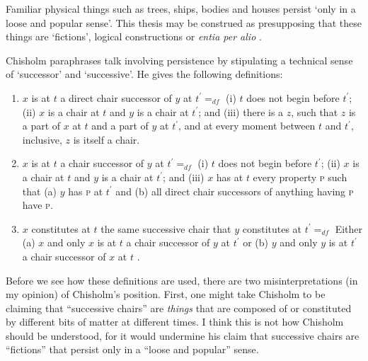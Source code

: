 \documentclass[11pt]{article}
\newenvironment{squote}{%
\begin{spacing}{1}
\begin{list}{}{%
\setlength{\labelwidth}{0pt}%
\rightmargin\leftmargin%
}
\item\relax
}{%
\end{list}%
\end{spacing}
}
\begin{document}
\begin{spacing}{1.5}
\begin{squote}
Familiar physical things such as trees, ships, bodies and houses
persist `only in a loose and popular sense'.  This thesis may be
construed as presupposing that these things are `fictions', logical
constructions or {\em entia per alio} \citeyearpar[97]{chisholm1979}.
\end{squote}

Chisholm paraphrases talk involving persistence by stipulating a
technical sense of `successor' and `successive'.  He gives the
following definitions:

\begin{enumerate}[ref=\arabic*]
  \item $x$ is at $t$ a direct chair successor of $y$ at $t^{\prime}
    =_{df}$ (i) $t$ does not begin before $t^{\prime}$; (ii) $x$ is a
    chair at $t$ and $y$ is a chair at $t^{\prime}$; and (iii) there
    is a $z$, such that $z$ is a part of $x$ at $t$ and a part of $y$
    at $t^{\prime}$, and at every moment between $t$ and $t^{\prime}$,
    inclusive, $z$ is itself a chair. \label{suc1}
  \item $x$ is at $t$ a chair successor of $y$ at $t^{\prime} =_{df}$
    (i) $t$ does not begin before $t^{\prime}$; (ii) $x$ is a chair at
    $t$ and $y$ is a chair at $t^{\prime}$; and (iii) $x$ has at $t$
    every property \textsc{p} such that (a) $y$ has \textsc{p} at
    $t^{\prime}$ and (b) all direct chair successors of anything
    having \textsc{p} have \textsc{p}. \label{suc2}
  \item $x$ constitutes at $t$ the same successive chair that $y$
    constitutes at $t^{\prime} =_{df}$ Either (a) $x$ and only $x$ is
    at $t$ a chair successor of $y$ at $t^{\prime}$ or (b) $y$ and
    only $y$ is at $t^{\prime}$ a chair successor of $x$ at $t$
    \citep[99--100]{chisholm1979}. \label{suc3}
\end{enumerate}

Before we see how these definitions are used, there are two
misinterpretations (in my opinion) of Chisholm's position.  First, one
might take Chisholm to be claiming that ``successive chairs'' are {\em
  things} that are composed of or constituted by different bits of
matter at different times.  I think this is not how Chisholm should be
understood, for it would undermine his claim that successive chairs
are ``fictions'' that persist only in a ``loose and popular'' sense.


\end{spacing}
\end{document}
